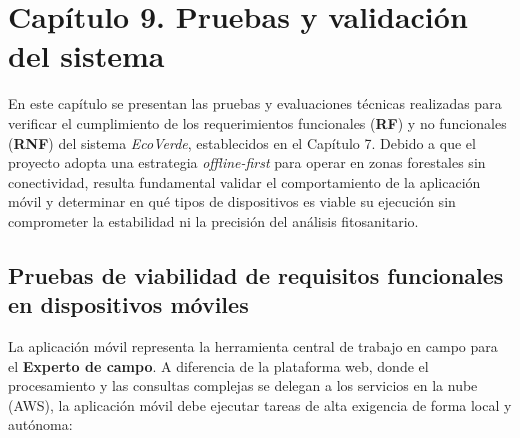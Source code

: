 \newpage
\section*{Capítulo 9. Pruebas y validación del sistema}
\setcounter{section}{9}
\setcounter{subsection}{0}

En este capítulo se presentan las pruebas y evaluaciones técnicas realizadas para verificar el cumplimiento de los requerimientos funcionales (\textbf{RF}) y no funcionales (\textbf{RNF}) del sistema \textit{EcoVerde}, establecidos en el Capítulo 7. Debido a que el proyecto adopta una estrategia \textit{offline-first} para operar en zonas forestales sin conectividad, resulta fundamental validar el comportamiento de la aplicación móvil y determinar en qué tipos de dispositivos es viable su ejecución sin comprometer la estabilidad ni la precisión del análisis fitosanitario.

\subsection{Pruebas de viabilidad de requisitos funcionales en dispositivos móviles}
\label{subsec:pruebas-viabilidad-movil}

La aplicación móvil representa la herramienta central de trabajo en campo para el \textbf{Experto de campo}. A diferencia de la plataforma web, donde el procesamiento y las consultas complejas se delegan a los servicios en la nube (AWS), la aplicación móvil debe ejecutar tareas de alta exigencia de forma local y autónoma:

